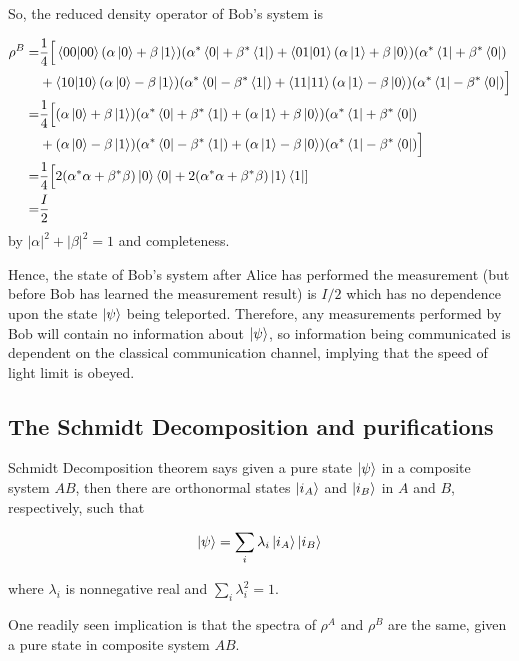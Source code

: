 \documentclass[11pt]{article}
\newcommand\0{\mathbf{0}}
\newcommand\<{\langle}
\renewcommand\>{\rangle}
\begin{document}
So, the reduced density operator of Bob's system is

\begin{align*}
	\rho^B =& \frac{1}{4}\Big[ \bra{00}\ket{00} (\alpha\ket{0} + \beta\ket{1})(\alpha^*\bra{0} + \beta^*\bra{1}) + \bra{01}\ket{01}(\alpha\ket{1} + \beta \ket{0})(\alpha^*\bra{1} + \beta^* \bra{0}) \\
	&+ \bra{10}\ket{10}(\alpha\ket{0} - \beta\ket{1})(\alpha^*\bra{0} - \beta^*\bra{1}) + \bra{11}\ket{11}(\alpha\ket{1} - \beta\ket{0})(\alpha^*\bra{1} - \beta^*\bra{0}) \Big] \\
	=& \frac{1}{4}\Big[(\alpha\ket{0} + \beta\ket{1})(\alpha^*\bra{0} + \beta^*\bra{1}) + (\alpha\ket{1} + \beta \ket{0})(\alpha^*\bra{1} + \beta^* \bra{0}) \\
	&+ (\alpha\ket{0} - \beta\ket{1})(\alpha^*\bra{0} - \beta^*\bra{1}) + (\alpha\ket{1} - \beta\ket{0})(\alpha^*\bra{1} - \beta^*\bra{0}) \Big] \\
	=& \frac{1}{4}\Big[2(\alpha^*\alpha + \beta^*\beta)\ket{0}\bra{0} + 2(\alpha^*\alpha + \beta^*\beta)\ket{1}\bra{1}] \\
	=& \frac{I}{2}
\end{align*}
by $|\alpha|^2 + |\beta|^2 = 1$ and completeness.

Hence, the state of Bob's system after Alice has performed the measurement (but before Bob has learned the measurement result) is $I/2$ which has no dependence upon the state $\ket{\psi}$ being teleported. Therefore, any measurements performed by Bob will contain no information about $\ket{\psi}$, so information being communicated is dependent on the classical communication channel, implying that the speed of light limit is obeyed.

\subsection{The Schmidt Decomposition and purifications}

Schmidt Decomposition theorem says given a pure state $\ket{\psi}$ in a composite system $AB$, then there are orthonormal states $\ket{i_A}$ and $\ket{i_B}$ in $A$ and $B$, respectively, such that

\begin{align*}
\ket{\psi} = \sum_i \lambda_i \ket{i_A}\ket{i_B}	
\end{align*}

where $\lambda_i$ is nonnegative real and $\sum_i \lambda_i^2 = 1$.

One readily seen implication is that the spectra of $\rho^A$ and $\rho^B$ are the same, given a pure state in composite system $AB$. 
\end{document}
